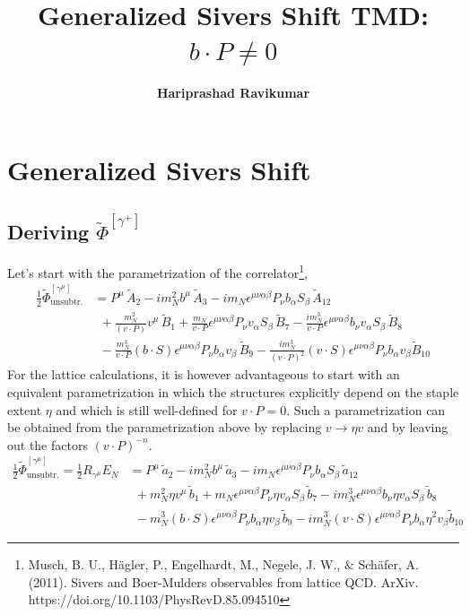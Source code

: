 \documentclass[]{article}
\title{Generalized Sivers Shift TMD: $b\cdot P \neq 0$}
\author{\textbf{Hariprashad Ravikumar}}
\date{}
\numberwithin{equation}{section}
\newcommand{\tcdot}{{\cdot}}
\newcommand{\tAmp}{\widetilde{A}}
\newcommand{\tBmp}{\widetilde{B}}
\newcommand{\tAmp}{\ensuremath{\widetilde{A}^{(+)}}}
\newcommand{\tBmp}{\ensuremath{\widetilde{B}^{(+)}}}
\newcommand{\bvec}{b}
\newcommand{\mN}{m_N}
\newcommand{\unsub}{\text{unsubtr.}}
\begin{document}
	\maketitle
\tableofcontents
\section{Generalized Sivers Shift}
\subsection{Deriving $\widetilde \Phi^{[\gamma^+]}$}
Let's start with the parametrization of the correlator\footnote{Musch, B. U., Hägler, P., Engelhardt, M., Negele, J. W., $\&$ Schäfer, A. (2011). Sivers and Boer-Mulders observables from lattice QCD. ArXiv. https://doi.org/10.1103/PhysRevD.85.094510},
\begin{align}
    \frac{1}{2}\widetilde \Phi^{[\gamma^\mu]}_{\unsub} & = 
		P^\mu\, \tAmp_2 - i \mN^2 \bvec^\mu\, \tAmp_3
		- i \mN \epsilon^{\mu \nu \alpha \beta} P_\nu \bvec_\alpha S_\beta\, \tAmp_{12} \nonumber \\ &
		~~+ \frac{\mN^2}{(v \tcdot P)} v^\mu\, \tBmp_1 
		+ \frac{\mN}{v \tcdot P} \epsilon^{\mu \nu \alpha \beta} P_\nu v_\alpha S_\beta\, \tBmp_7  
		- \frac{ i \mN^3}{v \tcdot P} \epsilon^{\mu \nu \alpha \beta} \bvec_\nu v_\alpha S_\beta\, \tBmp_8 \nonumber \\ &
		~~- \frac{\mN^3}{v \tcdot P} (\bvec \tcdot S) \epsilon^{\mu \nu \alpha \beta} P_\nu \bvec_\alpha v_\beta\, \tBmp_9
		- \frac{i \mN^3}{(v \tcdot P)^2} (v \tcdot S) \epsilon^{\mu \nu \alpha \beta} P_\nu \bvec_\alpha v_\beta \tBmp_{10}
\end{align}
 For the lattice calculations, it is however advantageous to start with an equivalent parametrization in which the structures explicitly depend on the staple extent $\eta$ and which is still well-defined for $v \tcdot P = 0$. Such a parametrization can be obtained from the parametrization above by replacing $v \rightarrow \eta v$ and by leaving out the factors $(v \tcdot P)^{-n}$. 
 \begin{align}
    \frac{1}{2}\widetilde \Phi^{[\gamma^\mu]}_{\unsub}=\frac{1}{2} R_{\gamma^{\mu}} E_N & =  
		P^\mu\, \tilde a_2 - i \mN^2 \bvec^\mu\, \tilde a_3
		- i \mN \epsilon^{\mu \nu \alpha \beta} P_\nu \bvec_\alpha S_\beta\, \tilde a_{12} \nonumber \\ &
		~~+ \mN^2 \eta v^\mu\, \tilde b_1 
		+ \mN \epsilon^{\mu \nu \alpha \beta} P_\nu \eta v_\alpha S_\beta\, \tilde b_7  
		-  i \mN^3 \epsilon^{\mu \nu \alpha \beta} \bvec_\nu \eta v_\alpha S_\beta\, \tilde b_8 \nonumber \\ &
		~~- \mN^3 (\bvec \tcdot S) \epsilon^{\mu \nu \alpha \beta} P_\nu \bvec_\alpha \eta v_\beta\, \tilde b_9
		-i \mN^3 (v \tcdot S) \epsilon^{\mu \nu \alpha \beta} P_\nu \bvec_\alpha \eta^2 v_\beta \tilde b_{10}
\end{align}
\end{document}

